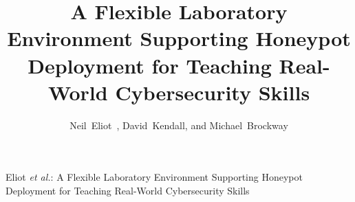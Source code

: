 \documentclass[10pt,journal]{IEEEtran}
\begin{document}
\title{A Flexible Laboratory Environment Supporting Honeypot Deployment for 
Teaching Real-World Cybersecurity Skills
}


\author{Neil~Eliot~, 
        David~Kendall, 
        and Michael~Brockway}


%
{Eliot \MakeLowercase{\textit{et al.}}: A Flexible Laboratory Environment Supporting Honeypot Deployment for Teaching Real-World Cybersecurity Skills}

\maketitle
\end{document}
